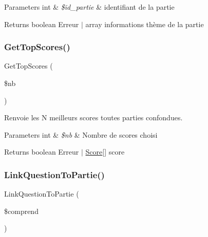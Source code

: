 \begin{DoxyParams}[1]{Parameters}
int & {\em \$id\+\_\+partie} & identifiant de la partie\\
\hline
\end{DoxyParams}
\begin{DoxyReturn}{Returns}
boolean Erreur $\vert$ array informations thème de la partie 
\end{DoxyReturn}
\mbox{\label{class_interface_b_d_d_a3c8410b12dc8ab5319af2f9b95248658}} 
\subsubsection{\texorpdfstring{Get\+Top\+Scores()}{GetTopScores()}}
{\footnotesize\ttfamily Get\+Top\+Scores (\begin{DoxyParamCaption}\item[{}]{\$nb }\end{DoxyParamCaption})}



Renvoie les N meilleurs scores toutes parties confondues. 


\begin{DoxyParams}[1]{Parameters}
int & {\em \$nb} & Nombre de scores choisi\\
\hline
\end{DoxyParams}
\begin{DoxyReturn}{Returns}
boolean Erreur $\vert$ \mbox{\hyperlink{class_score}{Score}}\mbox{[}\mbox{]} score 
\end{DoxyReturn}
\mbox{\label{class_interface_b_d_d_a230a88f1d16eb95926e03544b4a75279}} 
\subsubsection{\texorpdfstring{Link\+Question\+To\+Partie()}{LinkQuestionToPartie()}}
{\footnotesize\ttfamily Link\+Question\+To\+Partie (\begin{DoxyParamCaption}\item[{}]{\$comprend }\end{DoxyParamCaption})}



